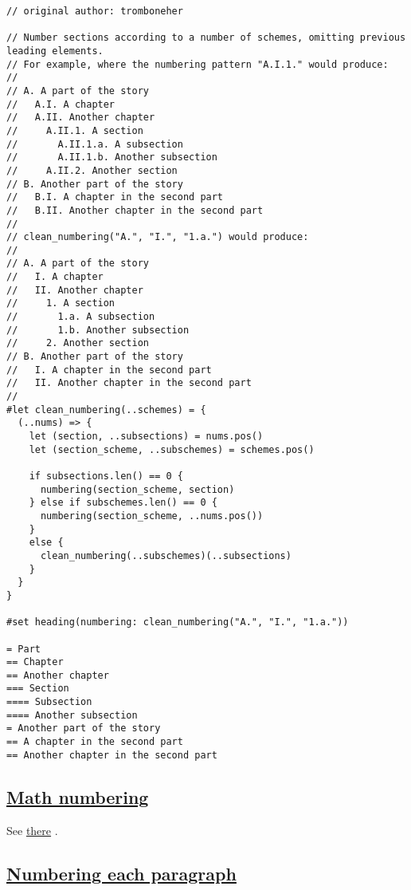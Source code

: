 \begin{verbatim}
// original author: tromboneher

// Number sections according to a number of schemes, omitting previous leading elements.
// For example, where the numbering pattern "A.I.1." would produce:
//
// A. A part of the story
//   A.I. A chapter
//   A.II. Another chapter
//     A.II.1. A section
//       A.II.1.a. A subsection
//       A.II.1.b. Another subsection
//     A.II.2. Another section
// B. Another part of the story
//   B.I. A chapter in the second part
//   B.II. Another chapter in the second part
//
// clean_numbering("A.", "I.", "1.a.") would produce:
//
// A. A part of the story
//   I. A chapter
//   II. Another chapter
//     1. A section
//       1.a. A subsection
//       1.b. Another subsection
//     2. Another section
// B. Another part of the story
//   I. A chapter in the second part
//   II. Another chapter in the second part
//
#let clean_numbering(..schemes) = {
  (..nums) => {
    let (section, ..subsections) = nums.pos()
    let (section_scheme, ..subschemes) = schemes.pos()

    if subsections.len() == 0 {
      numbering(section_scheme, section)
    } else if subschemes.len() == 0 {
      numbering(section_scheme, ..nums.pos())
    }
    else {
      clean_numbering(..subschemes)(..subsections)
    }
  }
}

#set heading(numbering: clean_numbering("A.", "I.", "1.a."))

= Part
== Chapter
== Another chapter
=== Section
==== Subsection
==== Another subsection
= Another part of the story
== A chapter in the second part
== Another chapter in the second part
\end{verbatim}

\pandocbounded{}

\subsection{\texorpdfstring{\hyperref[math-numbering]{Math
numbering}}{Math numbering}}\label{math-numbering}

See \href{./math/numbering.html}{there} .

\subsection{\texorpdfstring{\hyperref[numbering-each-paragraph]{Numbering
each
paragraph}}{Numbering each paragraph}}\label{numbering-each-paragraph}


